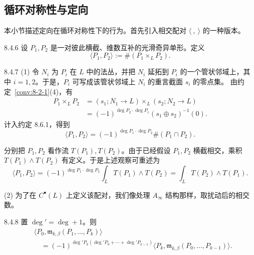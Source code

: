 
\subsection{循环对称性与定向}
\label{sec:8-4-2}

本小节描述定向在循环对称性下的行为。首先引入相交配对
$\langle\ ,\ \rangle$ 的一种版本。

\begin{definition}{8.4.6}\label{def:8-4-6}
设 $P_1,P_2$ 是一对彼此横截、维数互补的光滑奇异单形。定义
\[
 \langle P_1,P_2\rangle:=\#(P_1\times_LP_2).
\]
\end{definition}

\begin{remark}{8.4.7}\label{rem:8-4-7}
\textup{(1)} 令 $N_i$ 为 $P_i$ 在 $L$ 中的法丛，并把 $N_i$ 延拓到
$P_i$ 的一个管状邻域上，其中 $i=1,2$。于是，$P_i$ 可写成该管状邻域上
$N_i$ 的重言截面 $s_i$ 的零点集。%
由约定~\ref{conv:8-2-1}(4)，有
\[
\begin{aligned}
 P_1\times_LP_2
 &=(s_1;N_1\longrightarrow L)\times_L
   (s_2;N_2\longrightarrow L)\\
 &=(-1)^{\deg P_2\cdot\deg P_1}(s_1\oplus s_2)^{-1}(0).
\end{aligned}
\]
计入约定 8.6.1，得到
\[
 \langle P_1,P_2\rangle
 =(-1)^{\deg P_1\cdot\deg P_2}\#(P_1\cap P_2).
\]

分别把 $P_1,P_2$ 看作流 $T(P_1),T(P_2)$。由于已经假设 $P_1,P_2$
横截相交，乘积 $T(P_1)\wedge T(P_2)$ 有定义。于是上述观察可重述为
\[
 \langle P_1,P_2\rangle
 =(-1)^{\deg P_1\cdot\deg P_2}
   \int_L T(P_1)\wedge T(P_2)
 =\int_L T(P_2)\wedge T(P_1).
\]

\textup{(2)} 为了在 $C^\bullet(L)$ 上定义该配对，我们像处理
$A_\infty$ 结构那样，取扰动后的相交数。
\end{remark}

\begin{proposition}{8.4.8}\label{prop:8-4-8}
置 $\deg'=\deg+1$。则
\[
\begin{aligned}
 &\bigl\langle P_0,\mathfrak m_{k,\beta}(P_1,\ldots,P_k)\bigr\rangle\\
 &\quad={}
 (-1)^{\deg' P_k(\deg' P_0+\cdots+\deg' P_{k-1})}
 \bigl\langle P_k,\mathfrak m_{k,\beta}
 (P_0,\ldots,P_{k-1})\bigr\rangle.
\end{aligned}
\]
\end{proposition}

